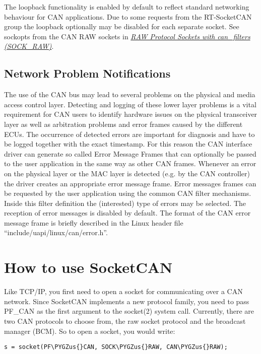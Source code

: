 \documentclass[a4paper,8pt,english]{sphinxmanual}
\def\PYGZus{\char`\_}
\begin{document}
The loopback functionality is enabled by default to reflect standard
networking behaviour for CAN applications. Due to some requests from
the RT-SocketCAN group the loopback optionally may be disabled for each
separate socket. See sockopts from the CAN RAW sockets in {\hyperref[networking/can:socketcan\string-raw\string-sockets]{\emph{RAW Protocol Sockets with can\_filters (SOCK\_RAW)}}}.


\subsection{Network Problem Notifications}
\label{networking/can:socketcan-network-problem-notifications}\label{networking/can:network-problem-notifications}
The use of the CAN bus may lead to several problems on the physical
and media access control layer. Detecting and logging of these lower
layer problems is a vital requirement for CAN users to identify
hardware issues on the physical transceiver layer as well as
arbitration problems and error frames caused by the different
ECUs. The occurrence of detected errors are important for diagnosis
and have to be logged together with the exact timestamp. For this
reason the CAN interface driver can generate so called Error Message
Frames that can optionally be passed to the user application in the
same way as other CAN frames. Whenever an error on the physical layer
or the MAC layer is detected (e.g. by the CAN controller) the driver
creates an appropriate error message frame. Error messages frames can
be requested by the user application using the common CAN filter
mechanisms. Inside this filter definition the (interested) type of
errors may be selected. The reception of error messages is disabled
by default. The format of the CAN error message frame is briefly
described in the Linux header file ``include/uapi/linux/can/error.h''.


\section{How to use SocketCAN}
\label{networking/can:how-to-use-socketcan}
Like TCP/IP, you first need to open a socket for communicating over a
CAN network. Since SocketCAN implements a new protocol family, you
need to pass PF\_CAN as the first argument to the socket(2) system
call. Currently, there are two CAN protocols to choose from, the raw
socket protocol and the broadcast manager (BCM). So to open a socket,
you would write:

\begin{Verbatim}[commandchars=\\\{\}]
s = socket(PF\PYGZus{}CAN, SOCK\PYGZus{}RAW, CAN\PYGZus{}RAW);
\end{Verbatim}
\end{document}
